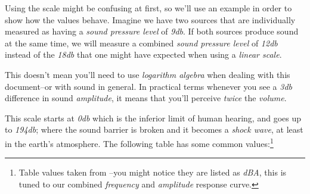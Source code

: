 \documentclass[10pt,a4paper]{report}
\newcommand{\dbSPL}[1]{\textit{\mbox{#1\acrshort{db}}}}
\begin{document}
Using the scale might be confusing at first, so we'll use an example in order to show how the values behave. Imagine we have two sources that are individually measured as having a \textit{sound pressure level} of \dbSPL{9}. If both sources produce sound at the same time, we will measure a combined \textit{sound pressure level} of \dbSPL{12} instead of the \dbSPL{18} that one might have expected when using a \textit{linear scale}. 

This doesn't mean you'll need to use \textit{logarithm algebra} when dealing with this document--or with sound in general. In practical terms whenever you see a \dbSPL{3} difference in sound \textit{amplitude}, it means that you'll perceive \textit{twice} the \textit{volume}.

\newpage
This scale starts at \dbSPL{0} which is the inferior limit of human hearing, and goes up to \dbSPL{194}; where the sound barrier is broken and it becomes a \textit{shock wave}, at least in the earth's atmosphere. The following table has some common values:\footnote{Table values taken from \cite{noiselevels}--you might notice they are listed as \textit{dBA}, this is tuned to our combined \textit{frequency} and \textit{amplitude} response curve.}

\begin{center}
\end{center}
\end{document}
